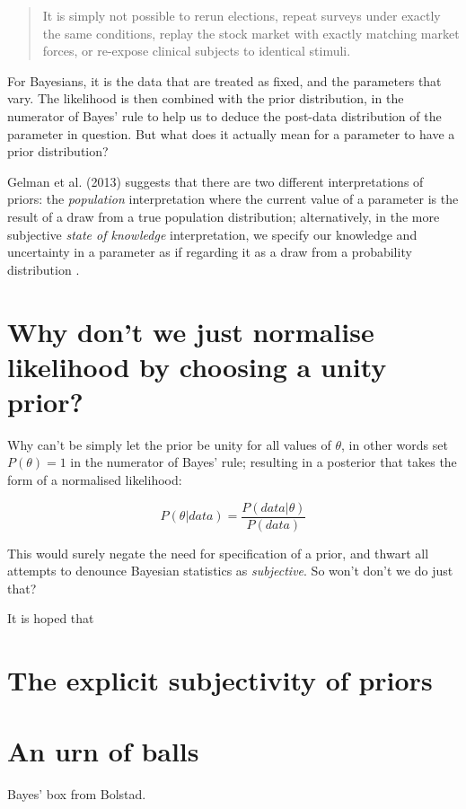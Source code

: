 \documentclass[11pt,fullpage]{book}
\begin{document}
\begin{quotation}
It is simply not possible to rerun elections, repeat surveys under exactly the same conditions, replay the stock market with exactly matching market forces, or re-expose clinical subjects to identical stimuli.
\end{quotation}

For Bayesians, it is the data that are treated as fixed, and the parameters that vary. The likelihood is then combined with the prior distribution, in the numerator of Bayes' rule to help us to deduce the post-data distribution of the parameter in question. But what does it actually mean for a parameter to have a prior distribution?

Gelman et al. (2013) suggests that there are two different interpretations of priors: the \textit{population} interpretation where the current value of a parameter is the result of a draw from a true population distribution; alternatively, in the more subjective \textit{state of knowledge} interpretation, we specify our knowledge and uncertainty in a parameter as if regarding it as a draw from a probability distribution \cite{gelman2013bayesian}.

\section{Why don't we just normalise likelihood by choosing a unity prior?}
Why can't be simply let the prior be unity for all values of $\theta$, in other words set $P(\theta) = 1$ in the numerator of Bayes' rule; resulting in a posterior that takes the form of a normalised likelihood:

\begin{equation}
P(\theta|data) = \frac{P(data|\theta)} {P(data)}
\end{equation}\label{eq:Prior_BayesNormalisedLikelihood}


This would surely negate the need for specification of a prior, and thwart all attempts to denounce Bayesian statistics as \textit{subjective}. So won't don't we do just that? 

It is hoped that 


\section{The explicit subjectivity of priors}
\section{An urn of balls} 
Bayes' box from Bolstad.
\end{document}
